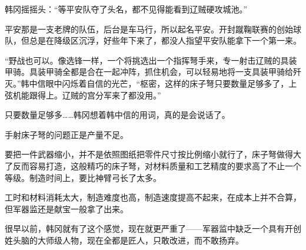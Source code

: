 韩冈摇摇头：“等平安队夺了头名，都不见得能看到辽贼硬攻城池。”

平安那是一支老牌的队伍，后台是车马行，所以起名平安。开封蹴鞠联赛的创始球队，但总是在降级区沉浮，好些年下来了，都没人指望平安队能拿下一个第一来。

“野战也可以。像选锋一样，一个将挑选出一个指挥弩手来，专一射击辽贼的具装甲骑。具装甲骑全都是合在一起冲阵，抓住机会，可以轻易地将一支具装甲骑给歼灭。”韩中信眼中闪烁着自信的光芒，“枢密，这样的床子弩只要数量足够多了，上弦机能跟得上。辽贼的宫分军来了都没用。”

只要数量足够多……韩冈想着韩中信的用词，真的是会说话了。

手射床子弩的问题正是产量不足。

要把一件武器缩小，并不是依照图纸把零件尺寸按比例缩小就行了，床子弩做得大了反而容易打造，这般精巧的床子弩，对材料质量和工艺精度的要求高了不止一个等级。制造时间上，要比神臂弓长了太多。

工时和材料消耗太大，制造难度也高，制造速度提高不起来，在成本上并不合算，但军器监还是献宝一般拿了出来。

很早以前，韩冈就有了这个感觉，现在就更严重了——军器监中缺乏一个具有开创姓头脑的大师级人物，现在全都是匠人，只敢改进，而不敢扬弃。
